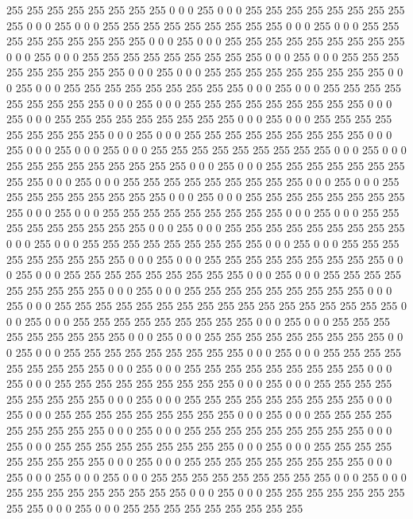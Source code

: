 255 255 255 255 255 255 255 255 0 0 0 255 0 0 0 255 255 255 255 255 255 255 255 255 0 0 0 255 0 0 0 255
255 255 255 255 255 255 255 255 0 0 0 255 0 0 0 255 255 255 255 255 255 255 255 255 0 0 0 255 0 0 0 255
255 255 255 255 255 255 255 255 0 0 0 255 0 0 0 255 255 255 255 255 255 255 255 255 0 0 0 255 0 0 0 255
255 255 255 255 255 255 255 255 0 0 0 255 0 0 0 255 255 255 255 255 255 255 255 255 0 0 0 255 0 0 0 255
255 255 255 255 255 255 255 255 0 0 0 255 0 0 0 255 255 255 255 255 255 255 255 255 0 0 0 255 0 0 0 255
255 255 255 255 255 255 255 255 0 0 0 255 0 0 0 255 255 255 255 255 255 255 255 255 0 0 0 255 0 0 0 255
255 255 255 255 255 255 255 255 0 0 0 255 0 0 0 255 255 255 255 255 255 255 255 255 0 0 0 255 0 0 0 255
0 0 0 255 0 0 0 255 255 255 255 255 255 255 255 255 0 0 0 255 0 0 0 255 255 255 255 255 255 255 255 255
0 0 0 255 0 0 0 255 255 255 255 255 255 255 255 255 0 0 0 255 0 0 0 255 255 255 255 255 255 255 255 255
0 0 0 255 0 0 0 255 255 255 255 255 255 255 255 255 0 0 0 255 0 0 0 255 255 255 255 255 255 255 255 255
0 0 0 255 0 0 0 255 255 255 255 255 255 255 255 255 0 0 0 255 0 0 0 255 255 255 255 255 255 255 255 255
0 0 0 255 0 0 0 255 255 255 255 255 255 255 255 255 0 0 0 255 0 0 0 255 255 255 255 255 255 255 255 255
0 0 0 255 0 0 0 255 255 255 255 255 255 255 255 255 0 0 0 255 0 0 0 255 255 255 255 255 255 255 255 255
0 0 0 255 0 0 0 255 255 255 255 255 255 255 255 255 0 0 0 255 0 0 0 255 255 255 255 255 255 255 255 255
0 0 0 255 0 0 0 255 255 255 255 255 255 255 255 255 0 0 0 255 0 0 0 255 255 255 255 255 255 255 255 255
255 255 255 255 255 255 255 255 0 0 0 255 0 0 0 255 255 255 255 255 255 255 255 255 0 0 0 255 0 0 0 255
255 255 255 255 255 255 255 255 0 0 0 255 0 0 0 255 255 255 255 255 255 255 255 255 0 0 0 255 0 0 0 255
255 255 255 255 255 255 255 255 0 0 0 255 0 0 0 255 255 255 255 255 255 255 255 255 0 0 0 255 0 0 0 255
255 255 255 255 255 255 255 255 0 0 0 255 0 0 0 255 255 255 255 255 255 255 255 255 0 0 0 255 0 0 0 255
255 255 255 255 255 255 255 255 0 0 0 255 0 0 0 255 255 255 255 255 255 255 255 255 0 0 0 255 0 0 0 255
255 255 255 255 255 255 255 255 0 0 0 255 0 0 0 255 255 255 255 255 255 255 255 255 0 0 0 255 0 0 0 255
255 255 255 255 255 255 255 255 0 0 0 255 0 0 0 255 255 255 255 255 255 255 255 255 0 0 0 255 0 0 0 255
255 255 255 255 255 255 255 255 0 0 0 255 0 0 0 255 255 255 255 255 255 255 255 255 0 0 0 255 0 0 0 255
0 0 0 255 0 0 0 255 255 255 255 255 255 255 255 255 0 0 0 255 0 0 0 255 255 255 255 255 255 255 255 255
0 0 0 255 0 0 0 255 255 255 255 255 255 255 255 255 0 0 0 255 0 0 0 255 255 255 255 255 255 255 255 255
